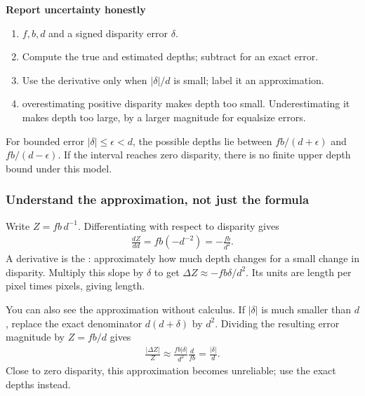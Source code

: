 \documentclass[letterpaper,11pt,english,openany,oneside]{jupyterBook}
\begin{document}
\begin{TextbookBox}
\textbf{Report uncertainty honestly}\par\smallskip
\begin{enumerate}
%
\item {}
\sphinxAtStartPar
{} \(f,b,d\) and a signed disparity error \(\delta\).

\item {}
\sphinxAtStartPar
Compute the true and estimated depths; subtract for an exact error.

\item {}
\sphinxAtStartPar
Use the derivative only when \(|\delta|/d\) is small; label it an approximation.

\item {}
\sphinxAtStartPar
{} overestimating positive disparity makes depth too small. Underestimating it makes depth too large, by a larger magnitude for equal\sphinxhyphen{}size errors.

\end{enumerate}

\sphinxAtStartPar
For bounded error \(|\delta|\le\epsilon<d\), the possible depths lie between \(fb/(d+\epsilon)\) and \(fb/(d-\epsilon)\). If the interval reaches zero disparity, there is no finite upper depth bound under this model.

\end{TextbookBox}


\subsubsection{Understand the approximation, not just the formula}
\label{\detokenize{lectures/lecture04/stereo:understand-the-approximation-not-just-the-formula}}
\sphinxAtStartPar
Write \(Z=fb\,d^{-1}\). Differentiating with respect to disparity gives
\begin{equation*}
\begin{split}\frac{dZ}{dd}=fb(-d^{-2})=-\frac{fb}{d^2}.\end{split}
\end{equation*}
\sphinxAtStartPar
A derivative is the : approximately how much depth changes for a small change in disparity. Multiply this slope by \(\delta\) to get \(\Delta Z\approx-fb\delta/d^2\). Its units are length per pixel times pixels, giving length.

\sphinxAtStartPar
You can also see the approximation without calculus. If \(|\delta|\) is much smaller than \(d\), replace the exact denominator \(d(d+\delta)\) by \(d^2\). Dividing the resulting error magnitude by \(Z=fb/d\) gives
\begin{equation*}
\begin{split}\frac{|\Delta Z|}{Z}\approx
\frac{fb|\delta|}{d^2}\frac{d}{fb}=\frac{|\delta|}{d}.\end{split}
\end{equation*}
\sphinxAtStartPar
{} Close to zero disparity, this approximation becomes unreliable; use the exact depths instead.
\end{document}
